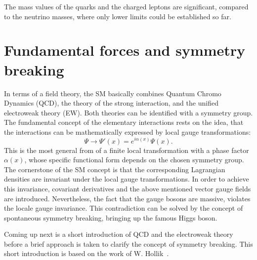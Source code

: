  The  mass values of the quarks and the charged leptons are significant, compared to the neutrino masses, where only lower limits could be established so far.
 
\vspace{0.1cm}




 


 
\section{Fundamental forces and symmetry breaking}
In terms of a field theory, the SM basically combines Quantum Chromo Dynamics (QCD), the theory of the strong interaction, and the unified electroweak theory (EW). Both theories can be identified with a symmetry group.
The fundamental concept of the  elementary interactions rests on the idea, that the interactions can be mathematically expressed by  local gauge transformations:
\begin{equation}\label{trafo}
\Psi \longrightarrow \Psi'(x) =  e^{i\alpha(x)}\Psi(x).
\end{equation}  
This is the most general from of a finite local transformation with a phase factor $\alpha(x)$, whose specific functional form depends  on the chosen symmetry group. 
The cornerstone of the SM concept is that the corresponding Lagrangian densities are invariant under the local gauge transformations.  
In order to achieve this invariance, covariant derivatives  and the above mentioned vector gauge fields are introduced. Nevertheless, the fact that the gauge bosons are massive, violates the locale gauge invariance. This contradiction can be solved by the concept of spontaneous symmetry breaking, bringing up the famous Higgs boson.

 Coming up next is a short introduction of QCD and the electroweak theory before a brief approach is taken to clarify the concept of symmetry breaking. This short introduction is based on the work of W. Hollik~\cite{Hollik:2010id}. 

